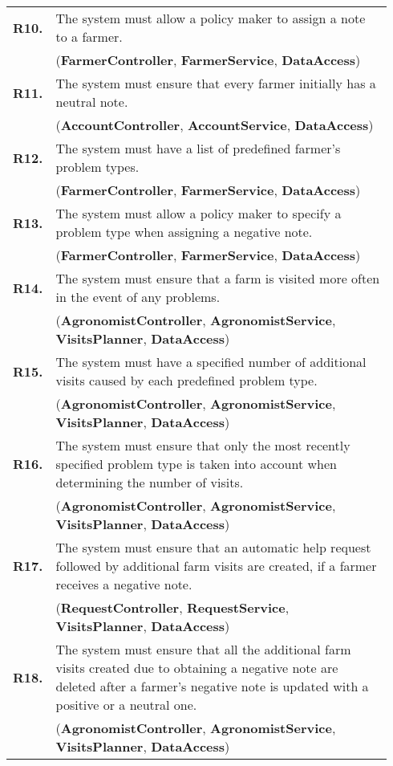 \begin{longtable}{p{0.06\linewidth} p{0.88\linewidth}}
	\textbf{R10.} & The system must allow a policy maker to assign a note to a farmer.\\
	& (\textbf{FarmerController}, \textbf{FarmerService}, \textbf{DataAccess})\\
	\textbf{R11.} & The system must ensure that every farmer initially has a neutral note.\\
	& (\textbf{AccountController}, \textbf{AccountService}, \textbf{DataAccess})\\
	\textbf{R12.} & The system must have a list of predefined farmer's problem types.\\
	& (\textbf{FarmerController}, \textbf{FarmerService}, \textbf{DataAccess})\\
    \textbf{R13.} & The system must allow a policy maker to specify a problem type when assigning a negative note.\\
    & (\textbf{FarmerController}, \textbf{FarmerService}, \textbf{DataAccess})\\
    \textbf{R14.} & The system must ensure that a farm is visited more often in the event of any problems.\\
    & (\textbf{AgronomistController}, \textbf{AgronomistService}, \textbf{VisitsPlanner}, \textbf{DataAccess})\\
    \textbf{R15.} & The system must have a specified number of additional visits caused by each predefined problem type.\\
    & (\textbf{AgronomistController}, \textbf{AgronomistService}, \textbf{VisitsPlanner}, \textbf{DataAccess})\\
    \textbf{R16.} & The system must ensure that only the most recently specified problem type is taken into account when determining the number of visits.\\
    & (\textbf{AgronomistController}, \textbf{AgronomistService}, \textbf{VisitsPlanner}, \textbf{DataAccess})\\
	\textbf{R17.} & The system must ensure that an automatic help request followed by additional farm visits are created, if a farmer receives a negative note.\\
	& (\textbf{RequestController}, \textbf{RequestService}, \textbf{VisitsPlanner}, \textbf{DataAccess})\\
	\textbf{R18.} & The system must ensure that all the additional farm visits created due to obtaining a negative note are deleted after a farmer's negative note is updated with a positive or a neutral one.\\
	& (\textbf{AgronomistController}, \textbf{AgronomistService}, \textbf{VisitsPlanner}, \textbf{DataAccess})\\
	

\end{longtable}

